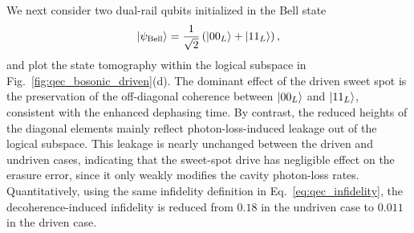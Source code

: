 We next consider two dual-rail qubits initialized in the Bell state
\begin{equation}
\ket{\psi_{\mathrm{Bell}}}
=
\frac{1}{\sqrt{2}}
\left(\ket{00_L}+\ket{11_L}\right),
\end{equation}
and plot the state tomography within the logical subspace in Fig.~\ref{fig:qec_bosonic_driven}(d). The dominant effect of the driven sweet spot is the preservation of the off-diagonal coherence between \(\ket{00_L}\) and \(\ket{11_L}\), consistent with the enhanced dephasing time. By contrast, the reduced heights of the diagonal elements mainly reflect photon-loss-induced leakage out of the logical subspace. This leakage is nearly unchanged between the driven and undriven cases, indicating that the sweet-spot drive has negligible effect on the erasure error, since it only weakly modifies the cavity photon-loss rates. Quantitatively, using the same infidelity definition in Eq.~\eqref{eq:qec_infidelity}, the decoherence-induced infidelity is reduced from \(0.18\) in the undriven case to \(0.011\) in the driven case.